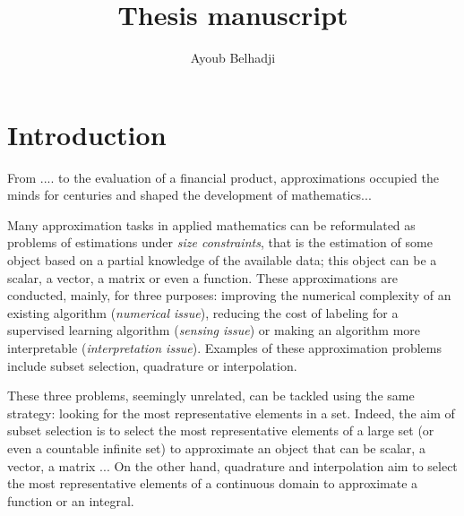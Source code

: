 \documentclass[twoside,11pt]{book}
\numberwithin{theorem}{chapter}
\numberwithin{definition}{chapter}
\numberwithin{proposition}{chapter}
\numberwithin{corollary}{chapter}
\numberwithin{example}{chapter}
\numberwithin{lemma}{chapter}
\numberwithin{assumption}{chapter}
\begin{document}
\title{Thesis manuscript}


\author{Ayoub Belhadji} %
 
\maketitle






\newpage
\chapter{Introduction}\label{chap:introduction}
From .... to the evaluation of a financial product, approximations occupied the minds for centuries and shaped the development of mathematics...




Many approximation tasks in applied mathematics can be reformulated as problems of estimations under \emph{size constraints}, that is the estimation of some object based on a partial knowledge of the available data; this object can be a scalar, a vector, a matrix or even a function. These approximations are conducted, mainly, for three purposes: improving the numerical complexity of an existing algorithm (\emph{numerical issue}), reducing the cost of labeling for a supervised learning algorithm (\emph{sensing issue}) or making an algorithm more interpretable (\emph{interpretation issue}). Examples of these approximation problems include subset selection, quadrature or interpolation. 


These three problems, seemingly unrelated, can be tackled using the same strategy: looking for the most representative elements in a set. Indeed,
the aim of subset selection is to select the most representative elements of a large set (or even a countable infinite set) to approximate an object that can be scalar, a vector, a matrix ... On the other hand, quadrature and interpolation aim to select the most representative elements of a continuous domain to approximate a function or an integral.
\end{document}

